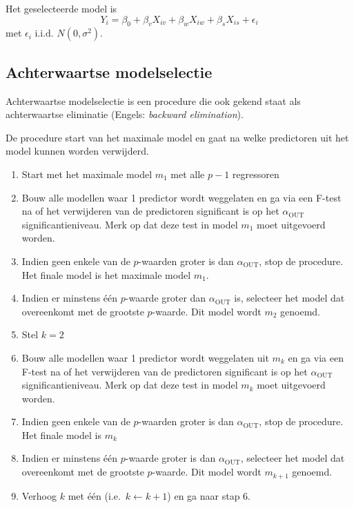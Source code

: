 \documentclass[
  dutch,
  letterpaper,
  12pt]{book}
\providecommand{\tightlist}{%
  \setlength{\itemsep}{0pt}\setlength{\parskip}{0pt}}
\theoremstyle{definition}
\theoremstyle{definition}
\theoremstyle{definition}
\theoremstyle{remark}
\begin{document}
Het geselecteerde model is
\[Y_i  = \beta_0 + \beta_v X_{iv} + \beta_w X_{iw} + \beta_s X_{is} + \epsilon_i\]
met \(\epsilon_i \text{ i.i.d. } N(0,\sigma^2)\).

\subsection{Achterwaartse
modelselectie}\label{achterwaartse-modelselectie}

Achterwaartse modelselectie is een procedure die ook gekend staat als
achterwaartse eliminatie (Engels: \emph{backward elimination}).

De procedure start van het maximale model en gaat na welke predictoren
uit het model kunnen worden verwijderd.

\begin{enumerate}
\def\labelenumi{\arabic{enumi}.}
\tightlist
\item
  Start met het maximale model \(m_1\) met alle \(p-1\) regressoren
\item
  Bouw alle modellen waar 1 predictor wordt weggelaten en ga via een
  F-test na of het verwijderen van de predictoren significant is op het
  \(\alpha_{\text{OUT}}\) significantieniveau. Merk op dat deze test in
  model \(m_1\) moet uitgevoerd worden.
\item
  Indien geen enkele van de \(p\)-waarden groter is dan
  \(\alpha_{\text{OUT}}\), stop de procedure. Het finale model is het
  maximale model \(m_1\).
\item
  Indien er minstens één \(p\)-waarde groter dan \(\alpha_{\text{OUT}}\)
  is, selecteer het model dat overeenkomt met de grootste \(p\)-waarde.
  Dit model wordt \(m_2\) genoemd.
\item
  Stel \(k=2\)
\item
  Bouw alle modellen waar 1 predictor wordt weggelaten uit \(m_k\) en ga
  via een F-test na of het verwijderen van de predictoren significant is
  op het \(\alpha_{\text{OUT}}\) significantieniveau. Merk op dat deze
  test in model \(m_k\) moet uitgevoerd worden.
\item
  Indien geen enkele van de \(p\)-waarden groter is dan
  \(\alpha_{\text{OUT}}\), stop de procedure. Het finale model is
  \(m_k\)
\item
  Indien er minstens één \(p\)-waarde groter is dan
  \(\alpha_{\text{OUT}}\), selecteer het model dat overeenkomt met de
  grootste \(p\)-waarde. Dit model wordt \(m_{k+1}\) genoemd.
\item
  Verhoog \(k\) met één (i.e.~\(k\leftarrow k+1\)) en ga naar stap 6.
\end{enumerate}
\end{document}
